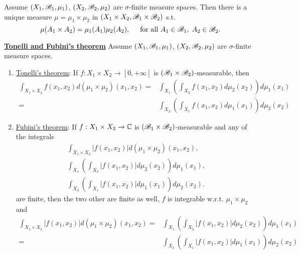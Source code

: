 \begin{theorem}
    Assume $(X_1,\mathscr{B}_1,\mu_1)$, $(X_2,\mathscr{B}_2,\mu_2)$ are $\sigma$-finite measure spaces. Then there is a unique measure $\mu=\mu_1\times\mu_2$ in $(X_1\times X_2,\mathscr{B}_1\times\mathscr{B}_2)$ s.t.
    \[\mu(A_1\times A_2)=\mu_1(A_1)\mu_2(A_2),\hspace{5mm}\text{for all } A_1\in\mathscr{B}_1,\hspace{1mm} A_2\in\mathscr{B}_2.\]
\end{theorem}
\begin{theorem}\underline{\textbf{Tonelli and Fubini's theorem}}
    Assume $(X_1,\mathscr{B}_1,\mu_1)$, $(X_2,\mathscr{B}_2,\mu_2)$ are $\sigma$-finite measure spaces.
    \begin{enumerate}
        \item\underline{Tonelli's theorem}:
        If $f:X_1\times X_2\rightarrow [0,+\infty]$ is $(\mathscr{B}_1\times \mathscr{B}_2)$-measurable, then 
        \begin{align*}
            \int_{X_1\times X_2}f(x_1,x_2)d(\mu_1\times \mu_2)(x_1,x_2)  =&  \int_{X_1}\left(\int_{X_2}f(x_1,x_2)d\mu_2(x_2)\right)d\mu_1(x_1)\\
            =&  \int_{X_2}\left(\int_{X_1}f(x_1,x_2)d\mu_1(x_1)\right)d\mu_2(x_2)
        \end{align*}
        \item\underline{Fubini's theorem}:
        If $f:X_1\times X_2\rightarrow \mathbb{C}$ is $(\mathscr{B}_1\times \mathscr{B}_2)$-measurable and any of the integrals 
        \begin{align*}
            \int_{X_1\times X_2}|f(x_1,x_2)|d(\mu_1\times \mu_2)(x_1,x_2), \\  \int_{X_1}\left(\int_{X_2}|f(x_1,x_2)|d\mu_2(x_2)\right)d\mu_1(x_1),\\
              \int_{X_2}\left(\int_{X_1}|f(x_1,x_2)|d\mu_1(x_1)\right)d\mu_2(x_2).
        \end{align*}
        are finite, then the two other are finite as well, $f$ is integrable w.r.t.  $\mu_1\times\mu_2$ and 
        \begin{align*}
            \int_{X_1\times X_2}|f(x_1,x_2)|d(\mu_1\times \mu_2)(x_1,x_2)  =&  \int_{X_1}\left(\int_{X_2}|f(x_1,x_2)|d\mu_2(x_2)\right)d\mu_1(x_1)\\
            =&  \int_{X_2}\left(\int_{X_1}|f(x_1,x_2)|d\mu_1(x_1)\right)d\mu_2(x_2)
        \end{align*}
    \end{enumerate}
\end{theorem}

